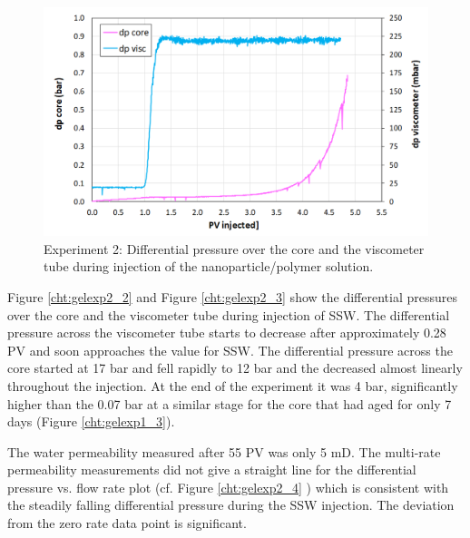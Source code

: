 \begin{figure}[h!]
    \centering
    \includegraphics[width=\textwidth]{img/cht/gelexp2_1.png}
    \caption{Experiment 2: Differential pressure over the core and the viscometer tube during injection of the nanoparticle/polymer solution.}
    \label{cht:gelexp2_1} %
\end{figure}

Figure \ref{cht:gelexp2_2} and Figure \ref{cht:gelexp2_3} show the differential pressures over the core and the viscometer tube during injection of SSW. The differential pressure across the viscometer tube starts to decrease after approximately 0.28 PV and soon approaches the value for SSW. The differential pressure across the core started at 17 bar and fell rapidly to 12 bar and the decreased almost linearly throughout the injection. At the end of the experiment it was 4 bar, significantly higher than the 0.07 bar at a similar stage for the core that had aged for only 7 days (Figure \ref{cht:gelexp1_3}). 

The water permeability measured after 55 PV was only 5 mD. The multi-rate permeability measurements did not give a straight line for the differential pressure vs. flow rate plot (cf. Figure \ref{cht:gelexp2_4} ) which is consistent with the steadily falling differential pressure during the SSW injection. The deviation from the zero rate data point is significant.


